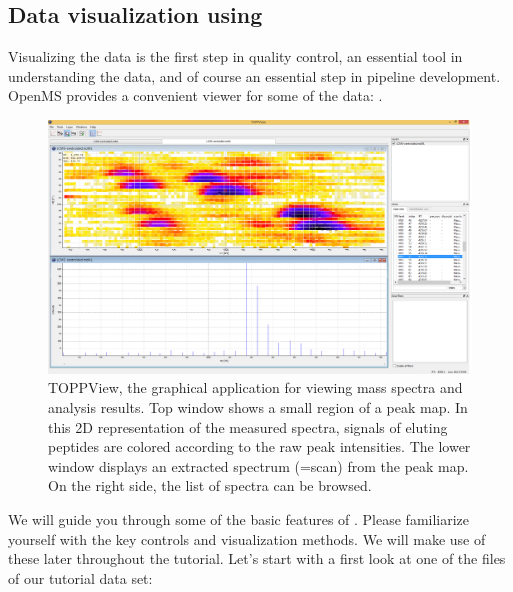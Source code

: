 
\subsection{Data visualization using }
\label{Data_Visualization}

Visualizing the data is the first step in quality control, an essential tool in understanding the data, and of course an essential step in pipeline development.
OpenMS provides a convenient viewer for some of the data: .

\begin{figure}
\includegraphics[width=\textwidth]{graphics/introduction/TOPPView.png}
\caption{TOPPView, the graphical application for viewing mass spectra and analysis results. Top window shows a small region of a peak map. In this 2D representation of the measured spectra, signals of eluting peptides are colored according to the raw peak intensities. The lower window displays an extracted spectrum (=scan) from the peak map. On the right side, the list of spectra can be browsed.}
\label{fig:toppview}
\end{figure}

We will guide you through some of the basic features of . Please familiarize yourself with the key controls and visualization methods.
We will make use of these later throughout the tutorial. Let's start with a first look at one of the files of our tutorial data set:

